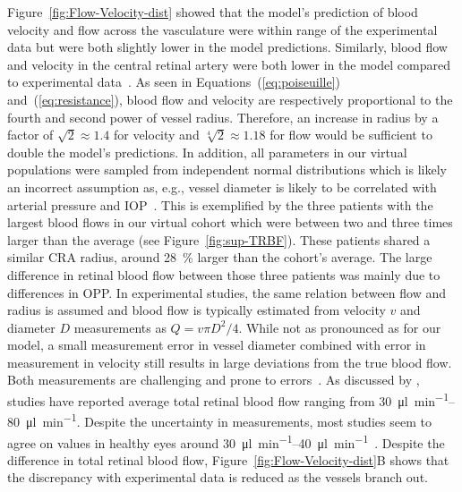 \documentclass[11pt,]{article}
\begin{document}
Figure~\ref{fig:Flow-Velocity-dist} showed that the model's prediction of blood velocity and flow across the vasculature were within range of the experimental data but were both slightly lower in the model predictions\cite{Riva1985,DoblhoffDier2014}.
Similarly, blood flow and velocity in the central retinal artery were both lower in the model compared to experimental data~\cite{DoblhoffDier2014,Riva1985,Dorner2009,Feke_1989}.
As seen in Equations~(\ref{eq:poiseuille}) and~(\ref{eq:resistance}), blood flow and velocity are respectively proportional to the fourth and second power of vessel radius.
Therefore, an increase in radius by a factor of $\sqrt{2}\approx 1.4$ for velocity and $\sqrt[4]{2}\approx 1.18$ for flow would be sufficient to double the model's predictions.
In addition, all parameters in our virtual populations were sampled from independent normal distributions which is likely an incorrect assumption as, e.g., vessel diameter is likely to be correlated with arterial pressure and IOP~\cite{Dziedziak_2022}.
This is exemplified by the three patients with the largest blood flows in our virtual cohort which were between two and three times larger than the average (see Figure~\ref{fig:sup-TRBF}).
These patients shared a similar CRA radius, around \SI{28}{\percent} larger than the cohort's average.
The large difference in retinal blood flow between those three patients was mainly due to differences in OPP.
In experimental studies, the same relation between flow and radius is assumed and blood flow is typically estimated from velocity $v$ and diameter $D$ measurements as $Q=v\pi D^2/4$.
While not as pronounced as for our model, a small measurement error in vessel diameter combined with error in measurement in velocity still results in large deviations from the true blood flow.
Both measurements are challenging and prone to errors~\cite{Leitgeb_2014}.
As discussed by \citet{DoblhoffDier2014}, studies have reported average total retinal blood flow ranging from \SIrange[per-mode=symbol]{30}{80}{\micro\litre\per\minute}\cite{DoblhoffDier2014,Riva1985,Feke_1989}.
Despite the uncertainty in measurements, most studies seem to agree on values in healthy eyes around \SIrange{30}{40}{\micro\litre\per\minute}~\cite{DoblhoffDier2014,Riva1985}.
Despite the difference in total retinal blood flow, Figure~\ref{fig:Flow-Velocity-dist}B shows that the discrepancy with experimental data is reduced as the vessels branch out.
\end{document}
